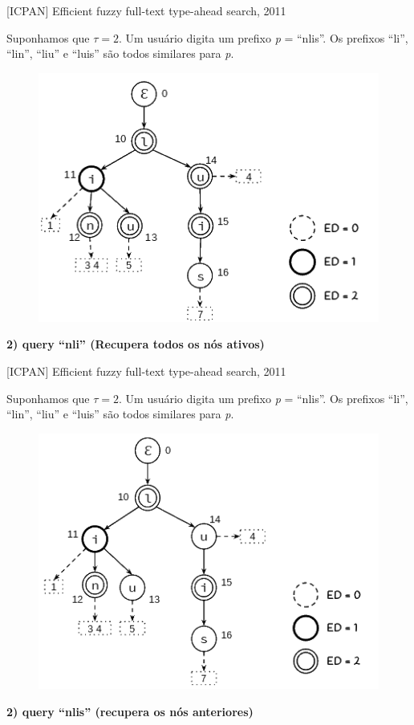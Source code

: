\documentclass[11pt]{beamer}
\begin{document}
\begin{frame}{[ICPAN] Efficient fuzzy full-text type-ahead search, 2011}
    
    \small
    Suponhamos que $\tau = 2$. Um usuário digita um prefixo \textit{p} = ``nlis''. Os prefixos ``li'', ``lin'', ``liu'' e ``luis'' são todos similares para \textit{p}.

    \begin{figure}
      \includegraphics[scale=0.50]{pictures/ipcan_full_3.png}
      \centering
    \end{figure}
    
    \textbf{2) query ``nli'' (Recupera todos os nós ativos)}
    
\end{frame}

\begin{frame}{[ICPAN] Efficient fuzzy full-text type-ahead search, 2011}
    
    \small
    Suponhamos que $\tau = 2$. Um usuário digita um prefixo \textit{p} = ``nlis''. Os prefixos ``li'', ``lin'', ``liu'' e ``luis'' são todos similares para \textit{p}.

    \begin{figure}
      \includegraphics[scale=0.50]{pictures/icpan_4.png}
      \centering
    \end{figure}
    
    \textbf{2) query ``nlis'' (recupera os nós anteriores)}
    
\end{frame}
\end{document}
